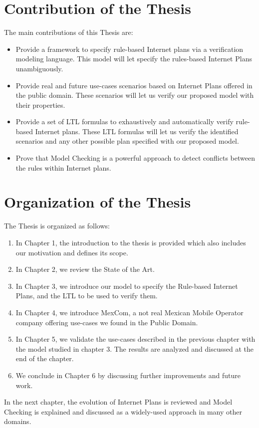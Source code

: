 \section{Contribution of the Thesis}
\noindent
The main contributions of this Thesis are:
\begin{itemize}
\item Provide a framework to specify rule-based Internet plans via a verification modeling language. This model will let specify the rules-based Internet Plans unambiguously.  
\item Provide real and future use-cases scenarios based on Internet Plans offered in the public domain. These scenarios will let us verify our proposed model with their properties. 
\item Provide a set of LTL formulas to exhaustively and automatically verify rule-based Internet plans. These LTL formulas will let us verify the identified scenarios and any other possible plan specified with our proposed model.   
\item Prove that Model Checking is a powerful approach to detect conflicts between the rules within Internet plans. 
\end{itemize}

\section{Organization of the Thesis}
\noindent
The Thesis is organized as follows: 
\begin{enumerate}
\item In Chapter 1, the introduction to the thesis is provided which also includes our motivation and defines its scope. 
\item In Chapter 2, we review the State of the Art.
\item In Chapter 3, we introduce our model to specify the Rule-based Internet Plans, and the LTL to be used to verify them. 
\item In Chapter 4, we introduce MexCom, a not real Mexican Mobile Operator company offering use-cases we found in the Public Domain. 
\item In Chapter 5, we validate the use-cases described in the previous chapter with the model studied in chapter 3. The results are analyzed and discussed at the end of the chapter.
\item We conclude in Chapter 6 by discussing further improvements and future work.
\end{enumerate}

In the next chapter, the evolution of Internet Plans is reviewed and Model Checking is explained and discussed as a widely-used approach in many other domains. \\

\clearpage